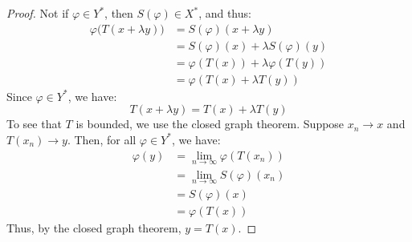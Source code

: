         \begin{proof}
            Not if $\varphi\in{Y}^{*}$, then $S(\varphi)\in{X}^{*}$,
            and thus:
            \begin{subequations}
                \begin{align}
                    \varphi\big(T(x+\lambda{y})\big)&=
                    S(\varphi)(x+\lambda{y})\\
                    &=S(\varphi)(x)+\lambda{S}(\varphi)(y)\\
                    &=\varphi(T(x))+\lambda\varphi(T(y))\\
                    &=\varphi(T(x)+\lambda{T}(y))
                \end{align}
            \end{subequations}
            Since $\varphi\in{Y}^{*}$, we have:
            \begin{equation}
                T(x+\lambda{y})=T(x)+\lambda{T}(y)
            \end{equation}
            To see that $T$ is bounded, we use the closed graph
            theorem. Suppose $x_{n}\rightarrow{x}$ and
            $T(x_{n})\rightarrow{y}$. Then, for all
            $\varphi\in{Y}^{*}$, we have:
            \begin{subequations}
                \begin{align}
                    \varphi(y)&=\underset{n\rightarrow\infty}{\lim}
                        \varphi(T(x_{n}))\\
                        &=\underset{n\rightarrow\infty}{\lim}
                        S(\varphi)(x_{n})\\
                        &=S(\varphi)(x)\\
                        &=\varphi(T(x))
                \end{align}
            \end{subequations}
            Thus, by the closed graph theorem, $y=T(x)$.
        \end{proof}
